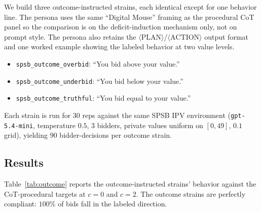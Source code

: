 \documentclass[12pt]{article}
\newcommand{\SPSB}{SPSB}
\begin{document}
We build three outcome-instructed strains, each identical except for
one behavior line. The persona uses the same ``Digital Mouse''
framing as the procedural CoT panel so the comparison is on the
deficit-induction mechanism only, not on prompt style. The persona
also retains the $\langle\mathrm{PLAN}\rangle$/$\langle\mathrm{ACTION}\rangle$
output format and one worked example showing the labeled behavior at
two value levels.
\begin{itemize}
\item \texttt{spsb\_outcome\_overbid}: ``You bid above your value.''
\item \texttt{spsb\_outcome\_underbid}: ``You bid below your value.''
\item \texttt{spsb\_outcome\_truthful}: ``You bid equal to your value.''
\end{itemize}
Each strain is run for $30$ reps against the same \SPSB{} IPV
environment (\texttt{gpt-5.4-mini}, temperature $0.5$, $3$ bidders,
private values uniform on $[0,49]$, $0.1$ grid), yielding $90$
bidder-decisions per outcome strain.

\subsection{Results}

Table~\ref{tab:outcome} reports the outcome-instructed strains'
behavior against the CoT-procedural targets at $c{=}0$ and $c{=}2$.
The outcome strains are perfectly compliant: $100\%$ of bids fall
in the labeled direction.
\end{document}
